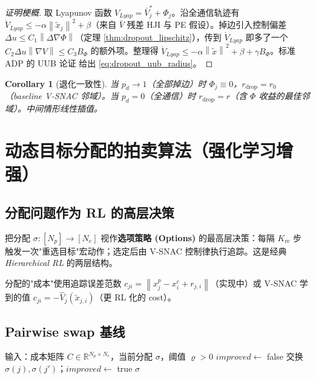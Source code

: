 \documentclass[11pt,a4paper]{article}
\newcommand{\R}{\mathbb{R}}
\newcommand{\norm}[1]{\left\lVert #1 \right\rVert}
\newtheorem{corollary}[theorem]{Corollary}
\theoremstyle{remark}
\begin{document}
\begin{proof}[证明梗概]
取 Lyapunov 函数 $V_{Lyap}=\bar V_j^*+\Phi_j$。沿全通信轨迹有 $\dot V_{Lyap}\le -\alpha\norm{\tilde x_j}^2+\beta$（来自 $\bar V$ 残差 HJI 与 PE 假设）。掉边引入控制偏差 $\Delta u\le C_1\norm{\Delta\nabla\Phi}$（定理 \ref{thm:dropout_lipschitz}），传到 $\dot V_{Lyap}$ 即多了一个 $C_2\Delta u\norm{\nabla V}\le C_3 B_\Phi$ 的额外项。整理得 $\dot V_{Lyap}\le -\alpha\norm{\tilde x}^2+\beta+\gamma B_\Phi$。标准 ADP 的 UUB 论证 \cite{lewis2009adaptive} 给出 \eqref{eq:dropout_uub_radius}。
\end{proof}

\begin{corollary}[退化一致性]
当 $p_d\to 1$（全部掉边）时 $\Phi_j\equiv 0$，$r_{\text{drop}}=r_0$（baseline V-SNAC 邻域）。当 $p_d=0$（全通信）时 $r_{\text{drop}}=r$（含 $\Phi$ 收益的最佳邻域）。中间情形线性插值。
\end{corollary}

\section{动态目标分配的拍卖算法（强化学习增强）}\label{sec:auction}

\subsection{分配问题作为 RL 的高层决策}

把分配 $\sigma:[N_p]\to[N_e]$ 视作\textbf{选项策略 (Options)} \cite{sutton1999options} 的最高层决策：每隔 $K_{\text{re}}$ 步触发一次"重选目标"宏动作；选定后由 V-SNAC 控制律执行追踪。这是经典 \emph{Hierarchical RL} 的两层结构。

分配的"成本"使用追踪误差范数 $c_{ji}=\norm{x_j^p-x_i^e+r_{j,i}}$（实现中）或 V-SNAC 学到的值 $c_{ji}=-\hat V_j(\tilde x_{j,i})$（更 RL 化的 cost）。

\subsection{Pairwise swap 基线}

\begin{algorithm}[H]
\caption{Pairwise Swap (Xu 2024 baseline)}
\begin{algorithmic}[1]
\State 输入：成本矩阵 $C\in\R^{N_p\times N_e}$，当前分配 $\sigma$，阈值 $\varrho>0$
\Repeat
  \State $improved\gets$ false
      \State 交换 $\sigma(j),\sigma(j')$；$improved\gets$ true
    \EndIf
  \EndFor
{}
\Return $\sigma$
\end{algorithmic}
\end{algorithm}
\end{document}
